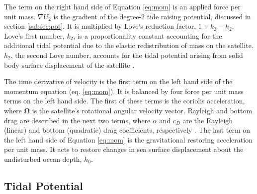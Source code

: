 The term on the right hand side of Equation \ref{eq:mom} is an applied force per unit mass. $\nabla U_2$ is the gradient of the degree-2 tide raising potential, discussed in section \ref{subsec:pot}. It is multiplied by Love's reduction factor, $1 + k_2 - h_2$. Love's first number, $k_2$, is a proportionality constant accounting for the additional tidal potential due to the elastic redistribution of mass on the satellite. $h_2$, the second Love number, accounts for the tidal potential arising from solid body surface displacement of the satellite \citep{love1911some}.

The time derivative of velocity is the first term on the left hand side of the momentum equation (eq. \ref{eq:mom}). It is balanced by four force per unit mass terms on the left hand side. The first of these terms is the coriolis acceleration, where $\bm{\Omega}$ is the satellite's rotational angular velocity vector. Rayleigh and bottom drag are described in the next two terms, where $\alpha$ and $c_D$ are the Rayleigh (linear) and bottom (quadratic) drag coefficients, respectively \citep{sears1995tidal,chen2013tidal}. The last term on the left hand side of Equation \ref{eq:mom} is the gravitational restoring acceleration per unit mass. It acts to restore changes in sea surface displacement about the undisturbed ocean depth, $h_0$.

\subsection{Tidal Potential \label{subsec:pot}}

